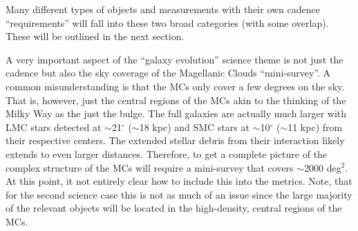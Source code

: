 Many different types of objects and measurements with their own
cadence ``requirements'' will fall into these two broad categories
(with some overlap).  These will be outlined in the next section.

A very important aspect of the ``galaxy evolution'' science theme is
not just the cadence but also the sky coverage of the Magellanic
Clouds ``mini-survey''.  A common misunderstanding is that the MCs
only cover a few degrees on the sky.  That is, however, just the
central regions of the MCs akin to the thinking of the Milky Way as
the just the bulge.  The full galaxies are actually much larger with
LMC stars detected at $\sim$21$^{\circ}$ ($\sim$18 kpc) and SMC stars
at $\sim$10$^{\circ}$ ($\sim$11 kpc) from their respective centers.
The extended stellar debris from their interaction likely extends to
even larger distances.  Therefore, to get a complete picture of the
complex structure of the MCs will require a mini-survey that covers
$\sim$2000 deg$^2$.  At this point, it not entirely clear how to
include this into the metrics.  Note, that for the second science case
this is not as much of an issue since the large majority of the
relevant objects will be located in the high-density, central regions
of the MCs.







